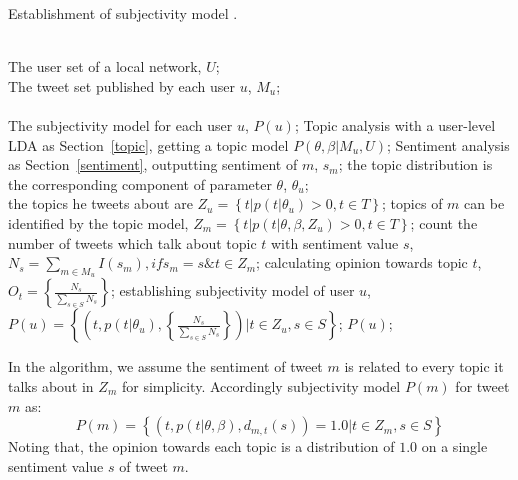 \documentclass[runningheads,a4paper]{llncs}
\begin{document}
\begin{algorithm}[htb] 
\caption{ Establishment of subjectivity model .} 
\label{alg1}
\begin{algorithmic}[1] %
\REQUIRE ~~\\ %
The user set of a local network, $ U $;\\
The tweet set published by each user $ u $, $ M_{u} $;\\
\ENSURE ~~\\ %
The subjectivity model for each user $ u $, $ P(u) $;
\STATE Topic analysis with a user-level LDA as Section~\ref{topic}, getting a topic model $P(\theta,\beta|M_{u},U)$; 
\label{ alg1:topic }%
\label{alg1:sentiment}
\STATE Sentiment analysis as Section~\ref{sentiment}, outputting sentiment of $ m $, $ s_{m} $;
\ENDFOR
{}
\STATE the topic distribution is the corresponding component of parameter $ \theta $, $ \theta_{u} $; \\
\STATE the topics he tweets about are $ Z_{u}= \left\lbrace t \vert p\left( t \vert \theta_{u} \right)>0, t \in T \right\rbrace $; 
\ENDFOR
{}
\STATE topics of $ m $ can be identified by the topic model, $ Z_{m} =\left\lbrace t \vert p\left( t \vert \theta, \beta, Z_{u} \right)>0, t \in T \right\rbrace $; 
\ENDFOR
{}
\STATE count the number of tweets which talk about topic $ t $ with sentiment value $ s $, $ N_{s}=\sum_{m \in M_{u}} I\left( s_{m} \right) ,  if  s_{m}=s \& t \in Z_{m} $; 
\ENDFOR
\STATE calculating opinion towards topic $ t $, $  O_{t} = \left\{ \frac{N_{s}}{\sum_{s \in S} N_{s}} \right\} $;
\ENDFOR
\STATE establishing subjectivity model of user $ u $, $ P\left( u \right)= \left\lbrace \left( t, p\left( t \vert \theta_{u} \right), \left\{ \frac{N_{s}}{\sum_{s \in S} N_{s}} \right\}  \right)  \vert t \in Z_{u}, s \in S  \right\rbrace   $;
\label{subuser}
\RETURN $P(u)$; %
\end{algorithmic}
\end{algorithm}
In the algorithm,  we assume the sentiment of tweet $ m $ is related to every topic it talks about in $ Z_{m} $ for simplicity.
Accordingly subjectivity model  $ P\left( m \right) $ for tweet $ m $ as:
\begin{equation}
\label{subtweet}
P\left( m \right)= \left\lbrace \left( t, p\left( t \vert \theta, \beta \right), d_{m,t}\left( s \right) \right)=1.0  \vert t \in Z_{m}, s \in S  \right\rbrace  
\end{equation}
Noting that, the opinion towards each topic is a distribution of $ 1.0 $ on a single sentiment value $ s $ of tweet $ m $.
\end{document}
